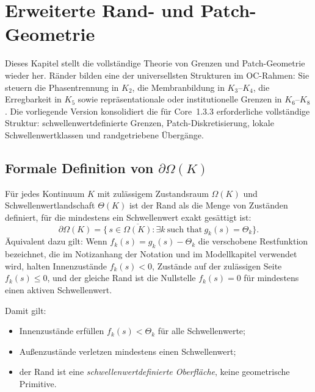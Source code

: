 
\section{Erweiterte Rand- und Patch-Geometrie}
\label{sec:boundary-extended}

Dieses Kapitel stellt die vollständige Theorie von Grenzen und Patch-Geometrie wieder her.
Ränder bilden eine der universellsten Strukturen im OC-Rahmen:
Sie steuern die Phasentrennung in \(K_2\), die Membranbildung in \(K_3\)--\(K_4\),
die Erregbarkeit in \(K_5\) sowie repräsentationale oder institutionelle Grenzen in
\(K_6\)--\(K_8\).
Die vorliegende Version konsolidiert die für Core~1.3.3 erforderliche vollständige Struktur:
schwellenwertdefinierte Grenzen, Patch-Diskretisierung, lokale Schwellenwertklassen
und randgetriebene Übergänge.

\subsection{Formale Definition von \texorpdfstring{$\partial\Omega(K)$}{boundary}}

Für jedes Kontinuum \(K\) mit zulässigem Zustandsraum \(\Omega(K)\) und Schwellenwertlandschaft
\(\Theta(K)\) ist der Rand als die Menge von Zuständen definiert, für die
mindestens ein Schwellenwert exakt gesättigt ist:
\[
  \partial\Omega(K)
  =
  \big\{\, s \in \overline{\Omega(K)} :
          \exists k\ \text{such that}\ g_k(s) = \Theta_k \big\}.
\]
Äquivalent dazu gilt: Wenn \(f_k(s)=g_k(s)-\Theta_k\) die verschobene Restfunktion
bezeichnet, die im Notizanhang der Notation und im Modellkapitel verwendet wird,
halten Innenzustände \(f_k(s)<0\), Zustände auf der zulässigen Seite \(f_k(s)\le0\), und
der gleiche Rand ist die Nullstelle \(f_k(s)=0\) für mindestens einen aktiven Schwellenwert.

Damit gilt:
\begin{itemize}
    \item Innenzustände erfüllen \(f_k(s) < \Theta_k\) für alle Schwellenwerte;
    \item Außenzustände verletzen mindestens einen Schwellenwert;
    \item der Rand ist eine \emph{schwellenwertdefinierte Oberfläche}, keine geometrische
          Primitive.
\end{itemize}

